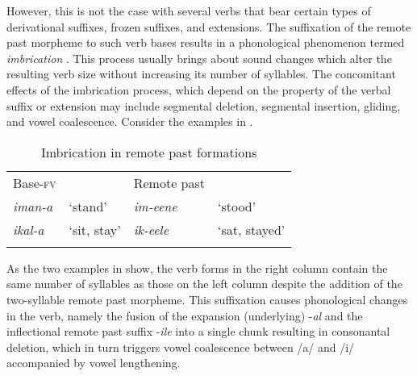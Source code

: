 \documentclass[output=paper]{langsci/langscibook}
\begin{document}
However, this is not the case with several verbs that bear certain types of derivational suffixes, frozen suffixes, and extensions. The suffixation of the remote past morpheme to such verb bases results in a phonological phenomenon termed \textit{imbrication} \citep{bastin1983}. This process usually brings about sound changes which alter the resulting verb size without increasing its number of syllables. The concomitant effects of the imbrication process, which depend on the property of the verbal suffix or extension may include segmental deletion, segmental insertion, gliding, and vowel coalescence. Consider the examples in . 

\begin{table}
\begin{tabular}{llll}
\lsptoprule
Base-\textsc{fv} &  & Remote past & \\
\textit{iman-a} & `stand' & \textit{im-eene} & `stood' \\
\textit{ikal-a} & `sit, stay' & \textit{ik-eele} & `sat, stayed' \\

\lspbottomrule
\end{tabular}

\caption{Imbrication in remote past formations}
\label{tab:19.kawasha}

\end{table}

As the two examples in  show, the verb forms in the right column contain the same number of syllables as those on the left column despite the addition of the two-syllable remote past morpheme. This suffixation causes phonological changes in the verb, namely the fusion of the expansion (underlying) -\textit{al} and the inflectional remote past suffix -\textit{ile} into a single chunk resulting in consonantal deletion, which in turn triggers vowel coalescence between /a/ and /i/ accompanied by vowel lengthening. 
\end{document}
